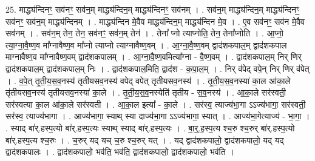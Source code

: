 \documentclass[17pt]{extarticle}
\begin{document}
25. माद्ध्य॑न्दिनꣳ॒॒ सव॑नꣳ॒॒ सव॑न॒म् माद्ध्य॑न्दिन॒म् माद्ध्य॑न्दिनꣳ॒॒ सव॑नम् । . सव॑न॒म् माद्ध्य॑न्दिन॒म् माद्ध्य॑न्दिनꣳ॒॒ सव॑नꣳ॒॒ सव॑न॒म् माद्ध्य॑न्दिनम् । . माद्ध्य॑न्दिन मे॒वैव माद्ध्य॑न्दिन॒म् माद्ध्य॑न्दिन मे॒व । . ए॒व सव॑नꣳ॒॒ सव॑न मे॒वैव सव॑नम् । . सव॑न॒म् तेन॒ तेन॒ सव॑नꣳ॒॒ सव॑न॒म् तेन॑ । . तेना᳚ प्नो त्याप्नोति॒ तेन॒ तेना᳚प्नोति । . आ॒प्नो॒ त्या॒ग्ना॒वै॒ष्ण॒व मा᳚ग्नावैष्ण॒व मा᳚प्नो त्याप्नो त्याग्नावैष्ण॒वम् । . आ॒ग्ना॒वै॒ष्ण॒वम् द्वाद॑शकपाल॒म् द्वाद॑शकपाल माग्नावैष्ण॒व मा᳚ग्नावैष्ण॒वम् द्वाद॑शकपालम् । . आ॒ग्ना॒वै॒ष्ण॒वमित्या᳚ग्ना - वै॒ष्ण॒वम् । . द्वाद॑शकपाल॒म् निर् णिर् द्वाद॑शकपाल॒म् द्वाद॑शकपाल॒म् निः । . द्वाद॑शकपाल॒मिति॒ द्वाद॑श - क॒पा॒ल॒म् । . निर् व॑पेद् वपे॒न् निर् णिर् व॑पेत् । . व॒पे॒त् तृ॒ती॒य॒स॒व॒नस्य॑ तृतीयसव॒नस्य॑ वपेद् वपेत् तृतीयसव॒नस्य॑ । . तृ॒ती॒य॒स॒व॒नस्या॑ का॒ल आ॑का॒ले तृ॑तीयसव॒नस्य॑ तृतीयसव॒नस्या॑ का॒ले । . तृ॒ती॒य॒स॒व॒नस्येति॑ तृतीय - स॒व॒नस्य॑ । . आ॒का॒ले सर॑स्वती॒ सर॑स्वत्या का॒ल आ॑का॒ले सर॑स्वती । . आ॒का॒ल इत्या᳚ - का॒ले । . सर॑स्व॒ त्याज्य॑भा॒गा ऽऽज्य॑भागा॒ सर॑स्वती॒ सर॑स्व॒ त्याज्य॑भागा । . आज्य॑भागा॒ स्याथ् स्या दाज्य॑भा॒गा ऽऽज्य॑भागा॒ स्यात् । . आज्य॑भा॒गेत्याज्य॑ - भा॒गा॒ । . स्याद् बा॑र्.हस्प॒त्यो बा॑र्.हस्प॒त्यः स्याथ् स्याद् बा॑र्.हस्प॒त्यः । . बा॒र्॒.ह॒स्प॒त्य श्च॒रु श्च॒रुर् बा॑र्.हस्प॒त्यो बा॑र्.हस्प॒त्य श्च॒रुः । . च॒रुर् यद् यच् च॒रु श्च॒रुर् यत् । . यद् द्वाद॑शकपालो॒ द्वाद॑शकपालो॒ यद् यद् द्वाद॑शकपालः । . द्वाद॑शकपालो॒ भव॑ति॒ भव॑ति॒ द्वाद॑शकपालो॒ द्वाद॑शकपालो॒ भव॑ति । \newline
\end{document}
